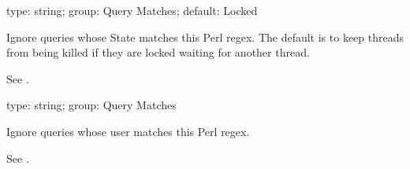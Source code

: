 \documentclass[letterpaper,10pt,english]{sphinxmanual}
\begin{document}
\begin{fulllineitems}
\label{\detokenize{mariadb-kill:cmdoption-mariadb-kill-ignore-state}}
type: string; group: Query Matches; default: Locked

Ignore queries whose State matches this Perl regex.  The default is to keep
threads from being killed if they are locked waiting for another thread.

See {\hyperref[\detokenize{mariadb-kill:cmdoption-mariadb-kill-match-state}]{}}.

\end{fulllineitems}


\begin{fulllineitems}
\label{\detokenize{mariadb-kill:cmdoption-mariadb-kill-ignore-user}}
type: string; group: Query Matches

Ignore queries whose user matches this Perl regex.

See {\hyperref[\detokenize{mariadb-kill:cmdoption-mariadb-kill-match-user}]{}}.

\end{fulllineitems}

\end{document}
